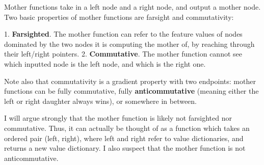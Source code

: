 
Mother functions take in a left node and a right node, and output a mother node. Two basic properties of mother functions are farsight and commutativity:

1. \textbf{Farsighted}. The mother function can refer to the feature values of nodes dominated by the two nodes it is computing the mother of, by reaching through their left/right pointers. 
2. \textbf{Commutative}. The mother function cannot see which inputted node is the left node, and which is the right one. 

Note also that commutativity is a gradient property with two endpoints: mother functions can be fully commutative, fully \textbf{anticommutative} (meaning either the left or right daughter always wins), or somewhere in between. 

I will argue strongly that the mother function is likely not farsighted nor commutative. Thus, it can actually be thought of as a function which takes an ordered pair (left, right), where left and right refer to value dictionaries, and returns a new value dictionary. I also suspect that the mother function is not anticommutative. 


